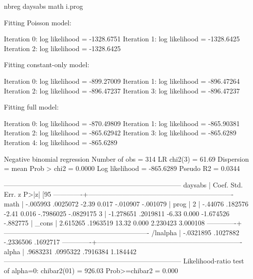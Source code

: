 nbreg daysabs math i.prog

Fitting Poisson model:

Iteration 0:   log likelihood = -1328.6751 
Iteration 1:   log likelihood = -1328.6425 
Iteration 2:   log likelihood = -1328.6425 

Fitting constant-only model:

Iteration 0:   log likelihood = -899.27009 
Iteration 1:   log likelihood = -896.47264 
Iteration 2:   log likelihood = -896.47237 
Iteration 3:   log likelihood = -896.47237 

Fitting full model:

Iteration 0:   log likelihood = -870.49809 
Iteration 1:   log likelihood = -865.90381 
Iteration 2:   log likelihood = -865.62942 
Iteration 3:   log likelihood =  -865.6289 
Iteration 4:   log likelihood =  -865.6289 

Negative binomial regression                      Number of obs   =        314
LR chi2(3)      =      61.69
Dispersion     = mean                             Prob > chi2     =     0.0000
Log likelihood = -865.6289                        Pseudo R2       =     0.0344

------------------------------------------------------------------------------
daysabs |      Coef.   Std. Err.      z    P>|z|     [95%
-------------+----------------------------------------------------------------
math |   -.005993   .0025072    -2.39   0.017     -.010907    -.001079
|
prog |
2  |    -.44076    .182576    -2.41   0.016    -.7986025   -.0829175
3  |  -1.278651   .2019811    -6.33   0.000    -1.674526    -.882775
|
_cons |   2.615265   .1963519    13.32   0.000     2.230423    3.000108
-------------+----------------------------------------------------------------
/lnalpha |  -.0321895   .1027882                     -.2336506    .1692717
-------------+----------------------------------------------------------------
alpha |   .9683231   .0995322                      .7916384    1.184442
------------------------------------------------------------------------------
Likelihood-ratio test of alpha=0:  chibar2(01) =  926.03 Prob>=chibar2 = 0.000

